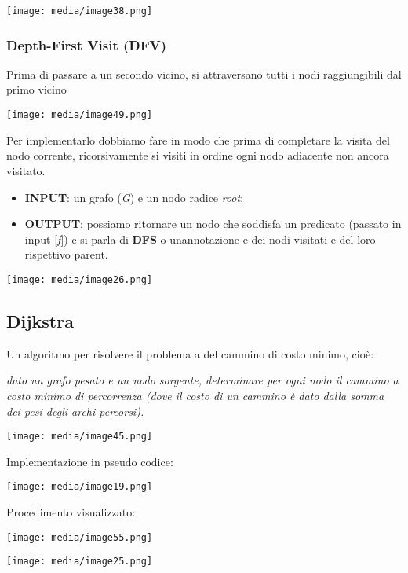 \texttt{[image: media/image38.png]}

\subsubsection{Depth-First Visit (DFV)}\label{depth-first-visit-dfv}

Prima di passare a un secondo vicino, si attraversano tutti i nodi
raggiungibili dal primo vicino

\texttt{[image: media/image49.png]}

Per implementarlo dobbiamo fare in modo che prima di completare la
visita del nodo corrente, ricorsivamente si visiti in ordine ogni nodo
adiacente non ancora visitato.

\begin{itemize}
\item
  \textbf{INPUT}: un grafo (\emph{G}) e un nodo radice \emph{root};
\item
  \textbf{OUTPUT}: possiamo ritornare un nodo che soddisfa un predicato
  (passato in input {[}\emph{f}{]}) e si parla di \textbf{DFS} o
  un\textquotesingle annotazione e dei nodi visitati e del loro
  rispettivo parent.
\end{itemize}

\texttt{[image: media/image26.png]}

\subsection{Dijkstra}\label{dijkstra}

Un algoritmo per risolvere il problema a del cammino di costo minimo,
cioè:

\emph{dato un grafo pesato e un nodo sorgente, determinare per ogni nodo
il cammino a costo minimo di percorrenza (dove il costo di un cammino è
dato dalla somma dei pesi degli archi percorsi).}

\texttt{[image: media/image45.png]}

Implementazione in pseudo codice:

\texttt{[image: media/image19.png]}

Procedimento visualizzato:

\texttt{[image: media/image55.png]}

\texttt{[image: media/image25.png]}

